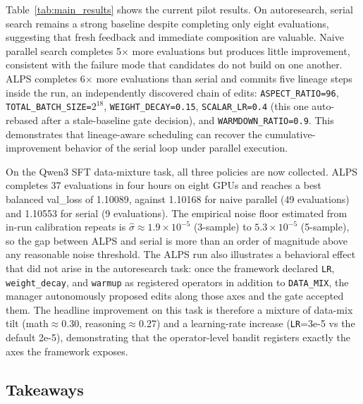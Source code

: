 \documentclass{article}
\newcommand{\alps}{ALPS\xspace}
\begin{document}
Table~\ref{tab:main_results} shows the current pilot results. On                  
  autoresearch, serial search remains a strong baseline despite                                     
  completing only eight evaluations, suggesting that fresh feedback                                 
  and immediate composition are valuable. Naive parallel search
  completes 5\(\times\) more evaluations but produces little improvement,                           
  consistent with the failure mode that candidates do not build on one                              
  another. \alps completes 6\(\times\) more evaluations than serial and
  commits five lineage steps inside the run, an independently                                       
  discovered chain of edits: \texttt{ASPECT\_RATIO=96},                                             
  \texttt{TOTAL\_BATCH\_SIZE=$2^{18}$}, \texttt{WEIGHT\_DECAY=0.15},                                
  \texttt{SCALAR\_LR=0.4} (this one auto-rebased after a stale-baseline                             
  gate decision), and \texttt{WARMDOWN\_RATIO=0.9}. This demonstrates                               
  that lineage-aware scheduling can recover the cumulative-improvement                              
  behavior of the serial loop under parallel execution.  

On the Qwen3 SFT data-mixture task, all three policies are now collected. \alps completes 37 evaluations in four hours on eight GPUs and reaches a best balanced val\_loss of 1.10089, against 1.10168 for naive parallel (49 evaluations) and 1.10553 for serial (9 evaluations). The empirical noise floor estimated from in-run calibration repeats is $\hat\sigma \approx 1.9 \times 10^{-5}$ (3-sample) to $5.3 \times 10^{-5}$ (5-sample), so the gap between \alps and serial is more than an order of magnitude above any reasonable noise threshold. The \alps run also illustrates a behavioral effect that did not arise in the autoresearch task: once the framework declared \texttt{LR}, \texttt{weight\_decay}, and \texttt{warmup} as registered operators in addition to \texttt{DATA\_MIX}, the manager autonomously proposed edits along those axes and the gate accepted them. The headline improvement on this task is therefore a mixture of data-mix tilt (math$\approx$0.30, reasoning$\approx$0.27) and a learning-rate increase (\texttt{LR}=3e-5 vs the default 2e-5), demonstrating that the operator-level bandit registers exactly the axes the framework exposes.

\subsection{Takeaways}
\end{document}
